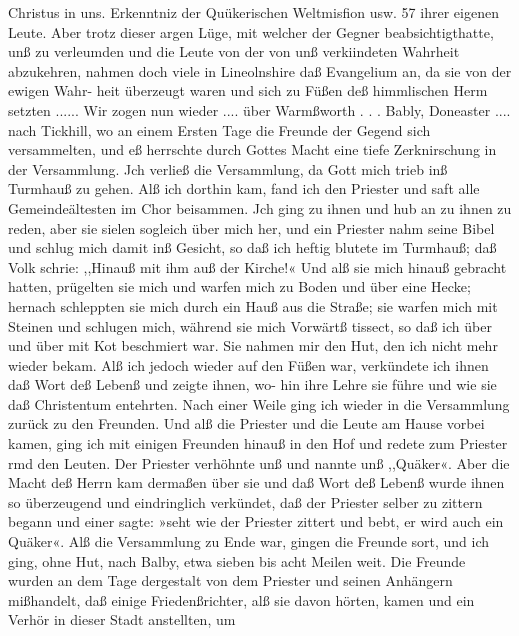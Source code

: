 Christus in uns. Erkenntniz der Quükerischen Weltmisfion usw. 57
ihrer eigenen Leute. Aber trotz dieser argen Lüge, mit welcher der
Gegner beabsichtigthatte, unß zu verleumden und die Leute von
der von unß verkiindeten Wahrheit abzukehren, nahmen doch viele
in Lineolnshire daß Evangelium an, da sie von der ewigen Wahr-
heit überzeugt waren und sich zu Füßen deß himmlischen Herm
setzten ......
Wir zogen nun wieder .... über Warmßworth . . . Bably,
Doneaster .... nach Tickhill, wo an einem Ersten Tage die
Freunde der Gegend sich versammelten, und eß herrschte durch
Gottes Macht eine tiefe Zerknirschung in der Versammlung.
Jch verließ die Versammlung, da Gott mich trieb inß Turmhauß
zu gehen. Alß ich dorthin kam, fand ich den Priester und saft
alle Gemeindeältesten im Chor beisammen. Jch ging zu ihnen
und hub an zu ihnen zu reden, aber sie sielen sogleich über mich
her, und ein Priester nahm seine Bibel und schlug mich damit
inß Gesicht, so daß ich heftig blutete im Turmhauß; daß Volk
schrie: ,,Hinauß mit ihm auß der Kirche!« Und alß sie mich hinauß
gebracht hatten, prügelten sie mich und warfen mich zu Boden
und über eine Hecke; hernach schleppten sie mich durch ein Hauß
aus die Straße; sie warfen mich mit Steinen und schlugen mich,
während sie mich Vorwärtß tissect, so daß ich über und über mit
Kot beschmiert war. Sie nahmen mir den Hut, den ich nicht
mehr wieder bekam. Alß ich jedoch wieder auf den Füßen war,
verkündete ich ihnen daß Wort deß Lebenß und zeigte ihnen, wo-
hin ihre Lehre sie führe und wie sie daß Christentum entehrten. Nach
einer Weile ging ich wieder in die Versammlung zurück zu den
Freunden. Und alß die Priester und die Leute am Hause vorbei
kamen, ging ich mit einigen Freunden hinauß in den Hof und
redete zum Priester rmd den Leuten. Der Priester verhöhnte
unß und nannte unß ,,Quäker«. Aber die Macht deß Herrn
kam dermaßen über sie und daß Wort deß Lebenß wurde ihnen
so überzeugend und eindringlich verkündet, daß der Priester selber
zu zittern begann und einer sagte: »seht wie der Priester zittert
und bebt, er wird auch ein Quäker«. Alß die Versammlung zu
Ende war, gingen die Freunde sort, und ich ging, ohne Hut,
nach Balby, etwa sieben bis acht Meilen weit. Die Freunde
wurden an dem Tage dergestalt von dem Priester und seinen
Anhängern mißhandelt, daß einige Friedenßrichter, alß sie davon
hörten, kamen und ein Verhör in dieser Stadt anstellten, um


